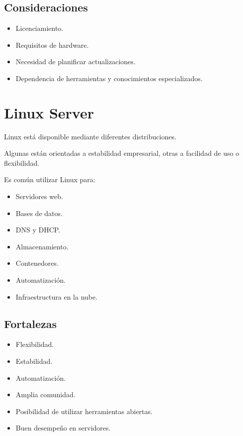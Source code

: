\documentclass[
  spanish,
  letterpaper,
]{scrbook}
\providecommand{\tightlist}{%
  \setlength{\itemsep}{0pt}\setlength{\parskip}{0pt}}
\begin{document}
\section{Consideraciones}\label{consideraciones}

\begin{itemize}
\tightlist
\item
  Licenciamiento.
\item
  Requisitos de hardware.
\item
  Necesidad de planificar actualizaciones.
\item
  Dependencia de herramientas y conocimientos especializados.
\end{itemize}


\chapter{Linux Server}\label{linux-server}

Linux está disponible mediante diferentes distribuciones.

Algunas están orientadas a estabilidad empresarial, otras a facilidad de
uso o flexibilidad.

Es común utilizar Linux para:

\begin{itemize}
\tightlist
\item
  Servidores web.
\item
  Bases de datos.
\item
  DNS y DHCP.
\item
  Almacenamiento.
\item
  Contenedores.
\item
  Automatización.
\item
  Infraestructura en la nube.
\end{itemize}

\section{Fortalezas}\label{fortalezas-1}

\begin{itemize}
\tightlist
\item
  Flexibilidad.
\item
  Estabilidad.
\item
  Automatización.
\item
  Amplia comunidad.
\item
  Posibilidad de utilizar herramientas abiertas.
\item
  Buen desempeño en servidores.
\end{itemize}
\end{document}
